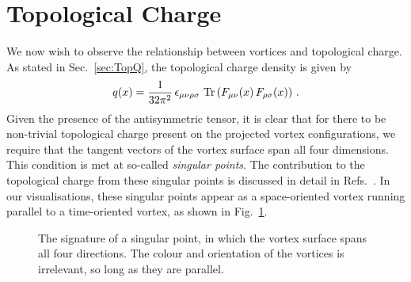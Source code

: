 \section{Topological Charge}\label{sec:TopChargeVis}
We now wish to observe the relationship between vortices and topological charge. As stated in Sec.~\ref{sec:TopQ}, the topological charge density is given by
%
\begin{equation}
q ( x ) = \frac { 1 } { 32 \pi ^ { 2 } } \, \epsilon _ { \mu \nu \rho \sigma } \, \operatorname{Tr}\left( F _ { \mu \nu }( x ) \, F _ { \rho \sigma }(x) \right) \, .
\end{equation}
%
Given the presence of the antisymmetric tensor, it is clear that for there to be non-trivial topological charge present on the projected vortex configurations, we require that the tangent vectors of the vortex surface span all four dimensions. This condition is met at so-called \textit{singular points}. The contribution to the topological charge from these singular points is discussed in detail in Refs.~\cite{Bruckmann:2003yd,Engelhardt:2010ft,Engelhardt:2000wc,Engelhardt:1999xw}. In our visualisations, these singular points appear as a space-oriented vortex running parallel to a time-oriented vortex, as shown in Fig.~\ref{fig:SingularPoint}.\\
%
\begin{figure}[htb!]
\centering
\scalebox{0.85}{}
\caption[The signature of a singular point, in which the vortex surface spans all four directions.]{\label{fig:SingularPoint} The signature of a singular point, in which the vortex surface spans all four directions. The colour and orientation of the vortices is irrelevant, so long as they are parallel.}
\end{figure}
%


